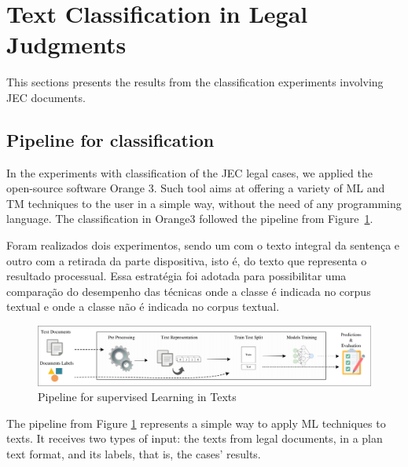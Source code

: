\section{Text Classification in Legal Judgments}





This sections presents the results from the classification experiments involving JEC documents.

\subsection{Pipeline for classification}

In the experiments with classification of the JEC legal cases, we applied the open-source software Orange 3. Such tool aims at offering a variety of ML and TM techniques to the user in a simple way, without the need of any programming language. The classification in Orange3 followed the pipeline from Figure~\ref{fig:cap4_pipeline_superv_ml}.


Foram realizados dois experimentos, sendo um com o texto integral da sentença e outro com a retirada da parte dispositiva, isto é, do texto que representa o resultado processual. Essa estratégia foi adotada para possibilitar uma comparação do desempenho das técnicas onde a classe é indicada no corpus textual e onde a classe não é indicada no corpus textual.


\begin{figure}[htb]
    \centering
    \caption{Pipeline for supervised Learning in Texts}
    \label{fig:cap4_pipeline_superv_ml}
    \includegraphics[width=\textwidth]{images/chapters/cap4_simple_pipeline.pdf}

\end{figure}

The pipeline from Figure \ref{fig:cap4_pipeline_superv_ml} represents a simple way to apply ML techniques to texts. It receives two types of input: the texts from legal documents, in a plan text format, and its labels, that is, the cases' results.

